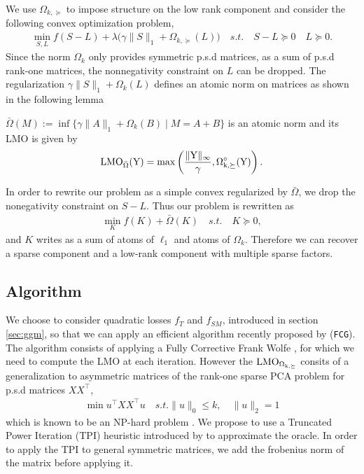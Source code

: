 We use $\Omega_{k,\succeq}$ to impose structure on the low rank component and consider the following convex optimization problem,
\begin{align}
\label{opt}
\min_{S,L} f(S-L)+\lambda\big(\gamma\|S\|_{1}+\Omega_{k,\succeq}(L)\big) \quad s.t. \quad S-L \succeq 0 \quad L \succeq 0.
\end{align}
Since the norm $\Omega_k$ only provides symmetric p.s.d matrices, as a sum of p.s.d rank-one matrices, the nonnegativity constraint on $L$ can be dropped. The regularization $\gamma\|S\|_{1}+\Omega_k(L)$ defines an atomic norm on matrices as shown in the following lemma
\begin{lemm} $\bar{\Omega}(M):=\inf\{\gamma\|A\|_{1}+\Omega_k(B)\mid M=A+B\}$ is an atomic norm and its \rm{LMO} is given by 
\begin{align*}
\rm{LMO}_{\bar{\Omega}}(Y)=\max\left(\frac{\|Y\|_{\infty}}{\gamma},\Omega_{k,\succeq}^{\circ}(Y)\right).
\end{align*}
\end{lemm}
In order to rewrite our problem as a simple convex regularized by $\bar{\Omega}$, we drop the nonegativity constraint on $S-L$. Thus our problem is rewritten as
\begin{align}
\label{opt_at}
\min_{K} f(K)+ \bar{\Omega}(K) \quad s.t. \quad K \succeq 0,
\end{align}
and $K$ writes as a sum of atoms of $\ell_1$ and atoms of $\Omega_k$. Therefore we can recover a sparse component and a low-rank component with multiple sparse factors.\\

\subsection{Algorithm}
We choose to consider quadratic losses $f_{T}$ and $f_{SM}$, introduced in section \ref{sec:ggm}, so that we can apply an efficient algorithm recently proposed by \citet{vinyes2017}(\texttt{FCG}). The algorithm consists of applying a Fully Corrective Frank Wolfe \citep{LacosteFCFW}, for which we need to compute the LMO at each iteration. However  the $\rm{LMO}_{\Omega_{k,\succeq}}$ consits of a generalization to asymmetric matrices of the rank-one sparse PCA problem for p.s.d matrices $XX^{\top}$,
\begin{align*}
\min u^{\top}XX^{\top}u \quad s.t.  \|u\|_0 \leq k,\quad \|u\|_2 = 1
\end{align*}
which is known to be an NP-hard problem \citep{moghaddam2008sparse}. We propose to use a Truncated Power Iteration (TPI) heuristic introduced by \citet{yuan2013truncated} to approximate the oracle. In order to apply the TPI to general symmetric matrices, we add the frobenius norm of the matrix before applying it. \\


